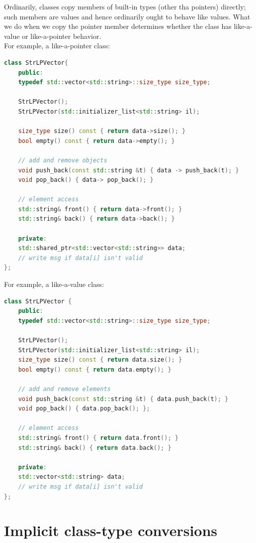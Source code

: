 Ordinarily, classes copy members of built-in types (other tha pointers) directly;
such members are values and hence ordinarily ought to behave like values. What we
do when we copy the pointer member determines whether the class has like-a-value or
like-a-pointer behavior.\\

For example, a like-a-pointer class:\\

\begin{lstlisting}[language=C++]
class StrLPVector{
    public:
    typedef std::vector<std::string>::size_type size_type;

    StrLPVector();
    StrLPVector(std::initializer_list<std::string> il);

    size_type size() const { return data->size(); }
    bool empty() const { return data->empty(); }

    // add and remove objects
    void push_back(const std::string &t) { data -> push_back(t); }
    void pop_back() { data-> pop_back(); }

    // element access
    std::string& front() { return data->front(); }
    std::string& back() { return data->back(); }

    private:
    std::shared_ptr<std::vector<std::string>> data;
    // write msg if data[i] isn't valid
};
\end{lstlisting}

For example, a like-a-value class:\\

\begin{lstlisting}[language=C++]
class StrLPVector {
    public:
    typedef std::vector<std::string>::size_type size_type;

    StrLPVector();
    StrLPVector(std::initializer_list<std::string> il);
    size_type size() const { return data.size(); }
    bool empty() const { return data.empty(); }

    // add and remove elements
    void push_back(const std::string &t) { data.push_back(t); }
    void pop_back() { data.pop_back(); };

    // element access
    std::string& front() { return data.front(); }
    std::string& back() { return data.back(); }

    private:
    std::vector<std::string> data;
    // write msg if data[i] isn't valid
};
\end{lstlisting}

\section{Implicit class-type conversions}

